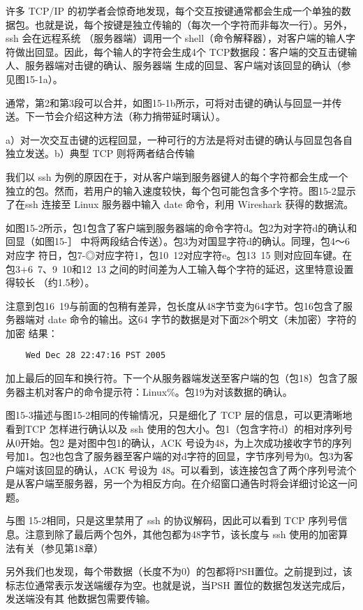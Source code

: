 许多 TCP/IP 的初学者会惊奇地发现，每个交互按键通常都会生成一个单独的数据包。也就是说，每个按键是独立传输的（每次一个字符而非每次一行）。另外，ssh 会在远程系统
（服务器端）调用一个 shell（命令解释器），对客户端的输人字符做出回显。因此，每个输人的字符会生成4个 TCP数据段：客户端的交互击键输人、服务器端对击键的确认、服务器端
生成的回显、客户端对该回显的确认（参见图15-1a）。

通常，第2和第3段可以合并，如图15-1b所示，可将对击键的确认与回显一并传送。下一节会介绍这种方法（称力捎带延时璃认）。

a）对一次交互击键的远程回显，一种可行的方法是将对击键的确认与回显包各自独立发送。b）典型 TCP 则将两者结合传输

我们以 ssh 为例的原因在于，对从客户端到服务器键人的每个字符都会生成一个独立的包。然而，若用户的输入速度较快，每个包可能包含多个字符。图15-2显示了在ssh 连接至
Linux 服务器中输入 date 命令，利用 Wireshark 获得的数据流。

如图15-2所示，包1包含了客户端到服务器端的命令字符d。包2为对字符d的确认和回显（如图15-］ 中将两段结合传送）。包3为对国显字符d的确认。同理，包4～6对应字
符日，包7-◎对应字符1，包10~12对应字符e。包13~15 则对应回车键。在包3+6~7、9~10和12~13 之间的时间差为人工输入每个字符的延迟，这里特意设置得较长
（约1.5秒）。

注意到包16~19与前面的包稍有差异，包长度从48字节变为64字节。包16包含了服务器端对 date 命令的输出。这64 字节的数据是对下面28个明文（未加密）字符的加密
结果：
\begin{verbatim}
    Wed Dec 28 22:47:16 PST 2005
\end{verbatim}
加上最后的回车和换行符。下一个从服务器端发送至客户端的包（包18）包含了服务器主机对客户的命令提示符：Linux\%。包19为对该数据的确认。

图15-3描述与图15-2相同的传输情况，只是细化了 TCP 层的信息，可以更清晰地看到TCP 怎样进行确认以及 ssh 使用的包大小。包1（包含字符d）的相对序列号从0开始。包2
是对图中包1的确认，ACK 号设为48，为上次成功接收字节的序列号加1。包2也包含了服务器至客户端的对d字符的回显，字节序列号为0。包3为客户端对该回显的确认，ACK
号设为 48。可以看到，该连接包含了两个序列号流个是从客户端至服务器，另一个为相反方向。在介绍窗口通告时将会详细讨论这一问题。

与图 15-2相同，只是这里禁用了 ssh 的协议解码，因此可以看到 TCP 序列号信息。注意到除了最后两个包外，其他包都为48字节，该长度与 ssh 使用的加密算法有关（参见第18章）

另外我们也发现，每个带数据（长度不为0）的包都将PSH置位。之前提到过，该标志位通常表示发送端缓存为空。也就是说，当PSH 置位的数据包发送完成后，发送端没有其
他数据包需要传输。


